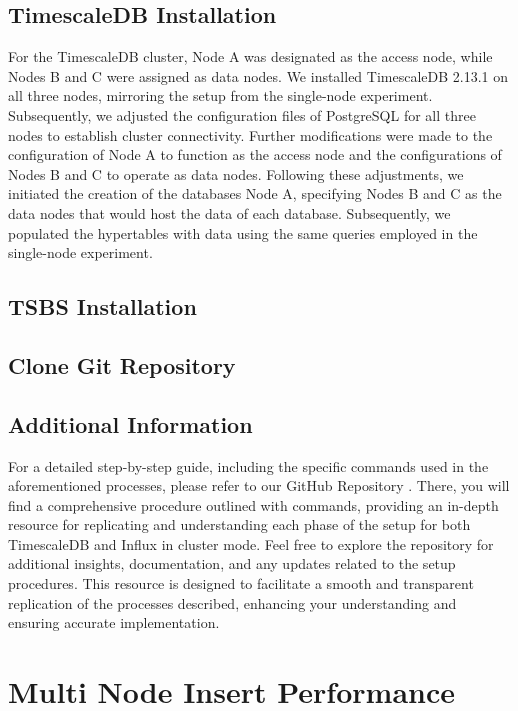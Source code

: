 \documentclass[conference]{IEEEtran}
\begin{document}
\subsection{TimescaleDB Installation}
For the TimescaleDB cluster, Node A was designated as the access node, while Nodes B and C were assigned as data nodes. We installed TimescaleDB 2.13.1 on all three nodes, mirroring the setup from the single-node experiment. Subsequently, we adjusted the configuration files of PostgreSQL for all three nodes to establish cluster connectivity. Further modifications were made to the configuration of Node A to function as the access node and the configurations of Nodes B and C to operate as data nodes. Following these adjustments, we initiated the creation of the databases Node A, specifying Nodes B and C as the data nodes that would host the data of each database. Subsequently, we populated the hypertables with data using the same queries employed in the single-node experiment.

\subsection{TSBS Installation}


\subsection{Clone Git Repository}


\subsection{Additional Information}
For a detailed step-by-step guide, including the specific commands used in the aforementioned processes, please refer to our GitHub Repository \cite{b2}. There, you will find a comprehensive procedure outlined with commands, providing an in-depth resource for replicating and understanding each phase of the setup for both TimescaleDB and Influx in cluster mode. Feel free to explore the repository for additional insights, documentation, and any updates related to the setup procedures. This resource is designed to facilitate a smooth and transparent replication of the processes described, enhancing your understanding and ensuring accurate implementation.



\section{Multi Node Insert Performance}
\end{document}
